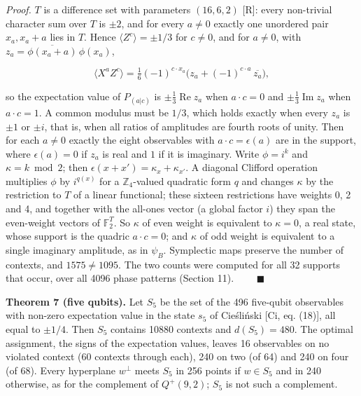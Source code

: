 \documentclass[11pt,a4paper]{article}
\begin{document}
\emph{Proof.} \(T\) is a difference set with parameters \((16,6,2)\) {[}R{]}: every non-trivial character sum over \(T\)
is \(\pm 2\), and for every \(a \ne 0\) exactly one unordered pair \(x_a, x_a + a\) lies in \(T\). Hence
\(\langle Z^c\rangle = \pm 1/3\) for \(c \ne 0\), and for \(a \ne 0\), with \(z_a = \overline{\phi(x_a + a)}\,\phi(x_a)\),

\[\langle X^a Z^c \rangle = \tfrac16 (-1)^{c \cdot x_a}\big( z_a + (-1)^{c \cdot a}\, \overline{z_a} \big),\]

so the expectation value of \(P_{(a|c)}\) is \(\pm\tfrac13 \operatorname{Re} z_a\) when \(a \cdot c = 0\) and
\(\pm\tfrac13 \operatorname{Im} z_a\) when \(a \cdot c = 1\). A common modulus must be \(1/3\), which holds exactly
when every \(z_a\) is \(\pm 1\) or \(\pm i\), that is, when all ratios of amplitudes are fourth roots of unity.
Then for each \(a \ne 0\) exactly the eight observables with \(a \cdot c = \epsilon(a)\) are in the support,
where \(\epsilon(a) = 0\) if \(z_a\) is real and \(1\) if it is imaginary. Write \(\phi = i^{k}\) and
\(\kappa = k \bmod 2\); then \(\epsilon(x + x') = \kappa_x + \kappa_{x'}\). A diagonal Clifford operation
multiplies \(\phi\) by \(i^{q(x)}\) for a \(\mathbb{Z}_4\)-valued quadratic form \(q\) and changes \(\kappa\) by the
restriction to \(T\) of a linear functional; these sixteen restrictions have weights 0, 2 and 4, and
together with the all-ones vector (a global factor \(i\)) they span the even-weight vectors of
\(\mathbb{F}_2^{T}\). So \(\kappa\) of even weight is equivalent to \(\kappa = 0\), a real state, whose support is
the quadric \(a \cdot c = 0\); and \(\kappa\) of odd weight is equivalent to a single imaginary amplitude, as
in \(\psi_B\). Symplectic maps preserve the number of contexts, and \(1575 \ne 1095\). The two counts were
computed for all 32 supports that occur, over all 4096 phase patterns (Section 11). \(\qquad\blacksquare\)

\textbf{Theorem 7 (five qubits).} Let \(S_5\) be the set of the 496 five-qubit observables with non-zero
expectation value in the state \(s_5\) of Cieśliński {[}Ci, eq. (18){]}, all equal to \(\pm 1/4\). Then
\(S_5\) contains 10880 contexts and \(d(S_5) = 480\). The optimal assignment, the signs of the expectation
values, leaves 16 observables on no violated context (60 contexts through
each), 240 on two (of 64) and 240 on four (of 68). Every hyperplane \(w^\perp\) meets \(S_5\) in 256 points
if \(w \in S_5\) and in 240 otherwise, as for the complement of \(Q^+(9,2)\); \(S_5\) is not such a complement.
\end{document}
